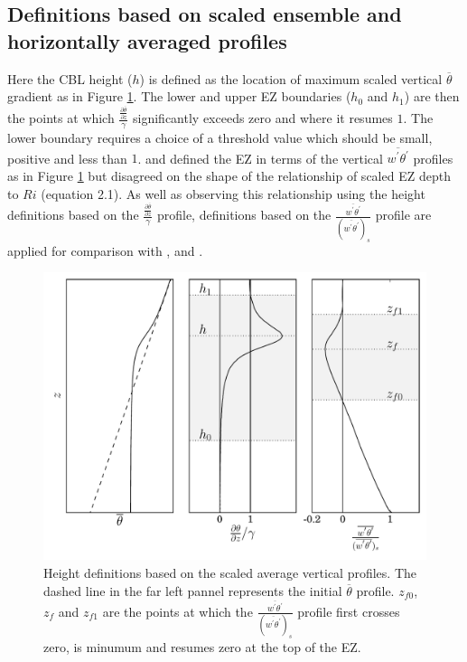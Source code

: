 \subsection{Definitions based on scaled ensemble and horizontally averaged profiles}

Here the CBL height ($h$) is defined as the location of maximum scaled vertical $\overline{\theta}$ gradient as in Figure \ref{fig:hdefs}.  The lower and upper EZ boundaries ($h_{0}$ and $h_{1}$) are then the points at which $\frac{\frac{\partial \overline{\theta}}{\partial z}}{\gamma}$ significantly exceeds zero and where it resumes $1$.  The lower boundary requires a choice of a threshold value which should be small, positive and less than $1$. \cite{FedConzMir04} and \cite{BrooksFowler2} defined the EZ in terms of the vertical $\overline{w^{'}\theta^{'}}$ profiles as in Figure \ref{fig:hdefs} but disagreed on the shape of the relationship of scaled EZ depth to $Ri$ (equation 2.1).  As well as observing this relationship using the height definitions based on the $\frac{\frac{\partial \overline{\theta}}{\partial z}}{\gamma}$ profile, definitions based on the $\frac{\overline{w^{'}\theta^{'}}}{(\overline{w^{'}\theta^{'}})_{s}}$ profile are applied for comparison with \cite{BrooksFowler2}, \cite{FedConzMir04} and \cite{GarciaMellado}.\\  

\begin{figure}[htbp]
    \centering
    
    \includegraphics[scale=.5]{figures/height_defs.pdf}
    \caption[Height Definitions]{Height definitions based on the scaled average vertical profiles. The dashed line in the far left pannel represents the initial $\overline{\theta}$ profile. $z_{f0}$, $z_{f}$ and $z_{f1}$ are the points at which the $\frac{\overline{w^{'}\theta^{'}}}{(\overline{w^{'}\theta^{'}})_{s}}$ profile first crosses zero, is minumum and resumes zero at the top of the EZ.}
    \label{fig:hdefs} 
\end{figure}

